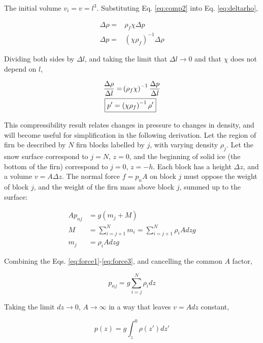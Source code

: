 \documentclass[12pt]{article}
\begin{document}
The initial volume $v_i = v = l^3$.  Substituting Eq. \ref{eq:comp2} into Eq. \ref{eq:deltarho}, 

\begin{align}
\Delta \rho =& \rho_{f} \chi \Delta p \\
\Delta p =& \left(\chi \rho_{f}\right)^{-1} \Delta \rho
\end{align}

Dividing both sides by $\Delta l$, and taking the limit that $\Delta l \to 0$ and that $\chi$ does not depend on $l$, 

\begin{align}
\frac{\Delta \rho}{\Delta l} =& \left(\rho_{f} \chi \right)^{-1} \frac{\Delta p}{\Delta l} \\
\Aboxed{p' =& \left(\chi \rho_{f}\right)^{-1} \rho'} \label{eq:note}
\end{align}

This compressibility result relates changes in pressure to changes in density, and will become useful for simplification in the following derivation.  Let the region of firn be described by $N$ firn blocks labelled by $j$, with varying density $\rho_j$.  Let the snow surface correspond to $j=N$, $z=0$, and the beginning of solid ice (the bottom of the firn) correspond to $j=0$, $z=-h$.  Each block has a height $\Delta z$, and a volume $v = A\Delta z$.  The normal force $f = p_{n} A$ on block $j$ must oppose the weight of block $j$, and the weight of the firn mass above block $j$, summed up to the surface:

\begin{align}
A p_{nj} &= g\left(m_{j} + M\right) \label{eq:force1} \\
M &= \sum_{i = j+1}^{N} m_{i} = \sum_{i = j+1}^{N} \rho_{i} A dz g \label{eq:force2} \\
m_{j} &= \rho_{i} A dz g \label{eq:force3}
\end{align}

Combining the Eqs. \ref{eq:force1}-\ref{eq:force3}, and cancelling the common $A$ factor,

\begin{equation}
p_{nj} = g \sum_{i = j}^{N} \rho_{i} dz
\end{equation}

Taking the limit $dz \to 0$, $A \to \infty$ in a way that leaves $v = A dz$ constant, 

\begin{equation}
p(z) = g \int_{z}^{0} \rho(z') dz'
\label{eq:rho1}
\end{equation}
\end{document}
